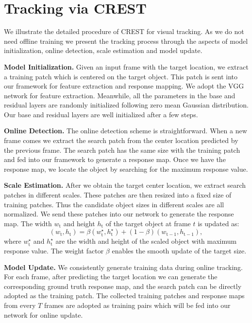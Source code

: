 \documentclass[10pt,twocolumn,letterpaper]{article}
\begin{document}
\section{Tracking via CREST}
We illustrate the detailed procedure of CREST for visual tracking.
As we do not need offline training we present the tracking process through the aspects of model initialization, online detection, scale estimation and model update.

{\flushleft \bf Model Initialization.}
Given an input frame with the target location, we extract a training patch which is centered on the target object. This patch is sent into our framework for feature extraction and response mapping. We adopt the VGG network \cite{simonyan-iclr14-very} for feature extraction. Meanwhile, all the parameters in the base and residual layers are randomly initialized following zero mean Gaussian distribution. Our base and residual layers are well initialized after a few steps.

{\flushleft \bf Online Detection.}
The online detection scheme is straightforward. When a new frame comes we extract the search patch from the center location predicted by the previous frame. The search patch has the same size with the training patch and fed into our framework to generate a response map. Once we have the response map, we locate the object by searching for the maximum response value.

{\flushleft \bf Scale Estimation.}
After we obtain the target center location, we extract search patches in different scales. These patches are then resized into a fixed size of training patches.
Thus the candidate object sizes in different scales are all normalized. We send these patches into our network to generate the response map. The width $w_\textrm{t}$ and height $h_\textrm{t}$ of the target object at frame $t$ is updated as:
\begin{equation}
(w_\textrm{t},h_\textrm{t})=\beta(w_\textrm{t}^\star,h_\textrm{t}^\star)+(1-\beta)(w_{\textrm{t}-1},h_{\textrm{t}-1}),
\label{eq:scale}
\end{equation}
where $w_\textrm{t}^\star$ and $h_\textrm{t}^\star$ are the width and height of the scaled object with maximum response value. The weight factor $\beta$ enables the smooth update of the target size.

{\flushleft \bf Model Update.}
We consistently generate training data during online tracking. For each frame, after predicting the target location we can generate the corresponding ground truth response map, and the search patch can be directly adopted as the training patch. The collected training patches and response maps from every $T$ frames are adopted as training pairs which will be fed into our network for online update.
\end{document}

